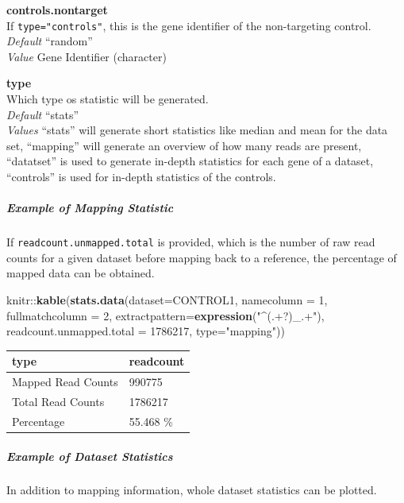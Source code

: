 \documentclass[]{article}
\newenvironment{Shaded}{\begin{snugshade}}{\end{snugshade}}
\newcommand{\KeywordTok}[1]{\textcolor[rgb]{0.13,0.29,0.53}{\textbf{{#1}}}}
\newcommand{\DataTypeTok}[1]{\textcolor[rgb]{0.13,0.29,0.53}{{#1}}}
\newcommand{\DecValTok}[1]{\textcolor[rgb]{0.00,0.00,0.81}{{#1}}}
\newcommand{\StringTok}[1]{\textcolor[rgb]{0.31,0.60,0.02}{{#1}}}
\newcommand{\NormalTok}[1]{{#1}}
\let\oldsubparagraph\subparagraph
\renewcommand{\subparagraph}[1]{\oldsubparagraph{#1}\mbox{}}
\begin{document}
\textbf{controls.nontarget}\\
If \texttt{type="controls"}, this is the gene identifier of the
non-targeting control.\\
\emph{Default} ``random''\\
\emph{Value} Gene Identifier (character)

\textbf{type}\\
Which type os statistic will be generated.\\
\emph{Default} ``stats''\\
\emph{Values} ``stats'' will generate short statistics like median and
mean for the data set, ``mapping'' will generate an overview of how many
reads are present, ``datatset'' is used to generate in-depth statistics
for each gene of a dataset, ``controls'' is used for in-depth statistics
of the controls.

\subparagraph{Example of Mapping
Statistic}\label{example-of-mapping-statistic}

If \texttt{readcount.unmapped.total} is provided, which is the number of
raw read counts for a given dataset before mapping back to a reference,
the percentage of mapped data can be obtained.

\begin{Shaded}
\begin{Highlighting}[]
\NormalTok{knitr::}\KeywordTok{kable}\NormalTok{(}\KeywordTok{stats.data}\NormalTok{(}\DataTypeTok{dataset=}\NormalTok{CONTROL1, }\DataTypeTok{namecolumn =} \DecValTok{1}\NormalTok{, }\DataTypeTok{fullmatchcolumn =} \DecValTok{2}\NormalTok{,}
  \DataTypeTok{extractpattern=}\KeywordTok{expression}\NormalTok{(}\StringTok{"^(.+?)_.+"}\NormalTok{), }\DataTypeTok{readcount.unmapped.total =} \DecValTok{1786217}\NormalTok{, }\DataTypeTok{type=}\StringTok{"mapping"}\NormalTok{))}
\end{Highlighting}
\end{Shaded}

\begin{longtable}[c]{@{}ll@{}}
\toprule
type & readcount\tabularnewline
\midrule
\endhead
Mapped Read Counts & 990775\tabularnewline
Total Read Counts & 1786217\tabularnewline
Percentage & 55.468 \%\tabularnewline
\bottomrule
\end{longtable}

\subparagraph{Example of Dataset
Statistics}\label{example-of-dataset-statistics}

In addition to mapping information, whole dataset statistics can be
plotted.
\end{document}
